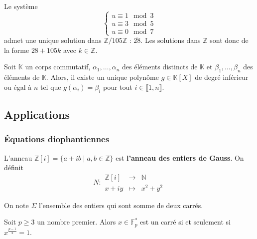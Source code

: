   \begin{example}
    Le système
    \[
      \begin{cases}
        u \equiv 1 \mod 3 \\
        u \equiv 3 \mod 5 \\
        u \equiv 0 \mod 7
      \end{cases}
    \]
    admet une unique solution dans $\mathbb{Z}/105\mathbb{Z}$ : $\overline{28}$. Les solutions dans $\mathbb{Z}$ sont donc de la forme $28 + 105k$ avec $k \in \mathbb{Z}$.
  \end{example}

  \begin{application}
    Soit $\mathbb{K}$ un corps commutatif, $\alpha_1, \dots, \alpha_n$ des éléments distincts de $\mathbb{K}$ et $\beta_1, \dots, \beta_n$ des éléments de $\mathbb{K}$. Alors, il existe un unique polynôme $g \in \mathbb{K}[X]$ de degré inférieur ou égal à $n$ tel que $g(\alpha_i) = \beta_i$ pour tout $i \in \llbracket 1, n \rrbracket$.
  \end{application}

  \subsection{Applications}

  \subsubsection{Équations diophantiennes}


  \begin{definition}
    L'anneau $\mathbb{Z}[i] = \{ a + ib \mid a, b \in \mathbb{Z} \}$ est \textbf{l'anneau des entiers de Gauss}. On définit
    \[
      N :
      \begin{array}{ccc}
        \mathbb{Z}[i] &\rightarrow& \mathbb{N} \\
        x+iy &\mapsto& x^2 + y^2
      \end{array}
    \]
  \end{definition}


  \begin{notation}
    On note $\Sigma$ l'ensemble des entiers qui sont somme de deux carrés.
  \end{notation}

  \begin{lemma}
    Soit $p \geq 3$ un nombre premier. Alors $x \in \mathbb{F}^*_p$ est un carré si et seulement si $x^{\frac{p-1}{2}} = 1$.
  \end{lemma}

